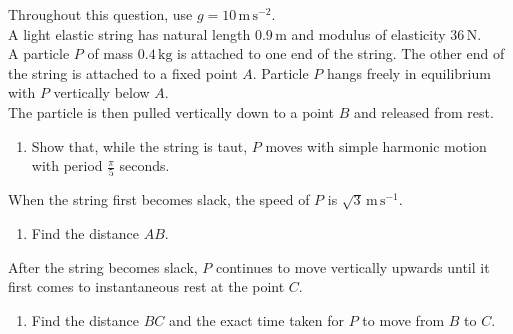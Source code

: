 \documentclass[leqno]{article}
\begin{document}
\begin{enumerate}[
  label=\textbf{\arabic*.},
  leftmargin=*,
  topsep=0pt,
  partopsep=0pt,
  parsep=0pt
]
\newpage

\questionitem

Throughout this question, use $g = 10\,\mathrm{m\,s^{-2}}$. \\
A light elastic string has natural length $0.9\,\mathrm{m}$ and modulus of elasticity $36\,\mathrm{N}$. \\
A particle $P$ of mass $0.4\,\mathrm{kg}$ is attached to one end of the string. The other end of the string is attached to a fixed point $A$. Particle $P$ hangs freely in equilibrium with $P$ vertically below $A$. \\
The particle is then pulled vertically down to a point $B$ and released from rest. \\
\begin{enumerate}[label=\textbf{(\alph*)}]
\item Show that, while the string is taut, $P$ moves with simple harmonic motion with period $\frac{\pi}{5}$ seconds.  \\
\end{enumerate}
When the string first becomes slack, the speed of $P$ is $\sqrt{3}\,\mathrm{m\,s^{-1}}$. \\
\begin{enumerate}[resume, label=\textbf{(\alph*)}]
\item Find the distance $AB$.  \\
\end{enumerate}
After the string becomes slack, $P$ continues to move vertically upwards until it first comes to instantaneous rest at the point $C$. \\
\begin{enumerate}[resume, label=\textbf{(\alph*)}]
\item Find the distance $BC$ and the exact time taken for $P$ to move from $B$ to $C$.  \\
\end{enumerate}

\newpage

\questionitem

\begin{figure}[H]
    \centering
{}
\end{figure}
\end{enumerate}
\end{document}
